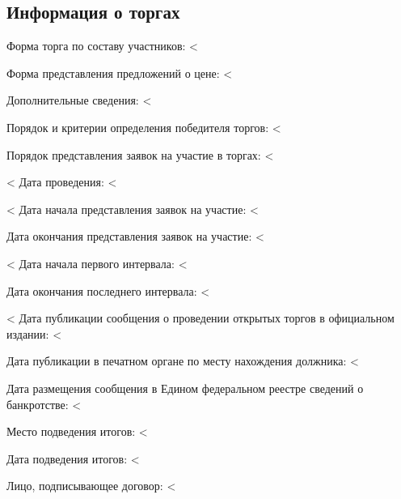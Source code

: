 \documentclass[a4paper,12pt]{article}
\begin{document}
{{{{{{{	\subsection*{Информация о торгах}
	{\color{Gray} Форма торга по составу участников:} <%
	\par
	{\color{Gray} Форма представления предложений о цене:} <%
	\par
	{\color{Gray} Дополнительные сведения:} <%
	\par
	{\color{Gray} Порядок и критерии определения победителя торгов:} <%
	\par
	{\color{Gray} Порядок представления заявок на участие в торгах:} <%
	\par
	<%
		{\color{Gray} Дата проведения:} <%
		\par
	<%
	{\color{Gray} Дата начала представления заявок на участие:} <%
	\par
	{\color{Gray} Дата окончания представления заявок на участие:} <%
	\par
	<%
		{\color{Gray} Дата начала первого интервала:} <%
		\par
		{\color{Gray} Дата окончания последнего интервала:} <%
		\par
	<%
	{\color{Gray} Дата публикации сообщения о проведении открытых торгов в официальном издании:} <%
	\par
	{\color{Gray} Дата публикации в печатном органе по месту нахождения должника:} <%
	\par
	{\color{Gray} Дата размещения сообщения в Едином федеральном реестре сведений о банкротстве:} <%
	\par
	{\color{Gray} Место подведения итогов:} <%
	\par
	{\color{Gray} Дата подведения итогов:} <%
	\par
	{\color{Gray} Лицо, подписывающее договор:} <%

}}}}}}}
\end{document}
